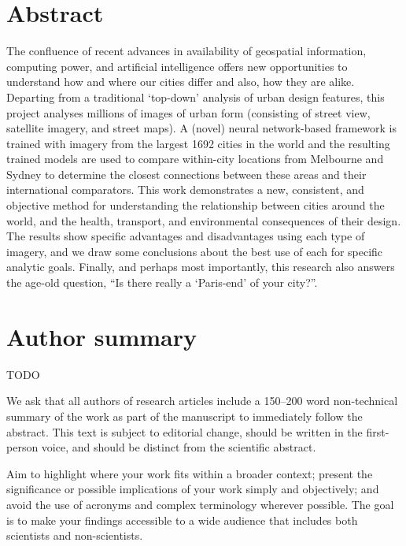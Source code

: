 \documentclass[10pt,letterpaper]{article}
\begin{document}
\section*{Abstract}
The confluence of recent advances in availability of geospatial information, computing power, and artificial intelligence offers new opportunities to understand how and where our cities differ and also, how they are alike. Departing from a traditional `top-down' analysis of urban design features, this project analyses millions of images of urban form (consisting of street view, satellite imagery, and street maps). A (novel) neural network-based framework is trained with imagery from the largest 1692 cities in the world and the resulting trained models are used to compare within-city locations from Melbourne and Sydney to determine the closest connections between these areas and their international comparators. This work demonstrates a new, consistent, and objective method for understanding the relationship between cities around the world, and the health, transport, and environmental consequences of their design. The results show specific advantages and disadvantages using each type of imagery, and we draw some conclusions about the best use of each for specific analytic goals. Finally, and perhaps most importantly, this research also answers the age-old question, ``Is there really a `Paris-end' of your city?''.


\section*{Author summary}
TODO 

We ask that all authors of research articles include a 150–200 word non-technical summary of the work as part of the manuscript to immediately follow the abstract. This text is subject to editorial change, should be written in the first-person voice, and should be distinct from the scientific abstract.

Aim to highlight where your work fits within a broader context; present the significance or possible implications of your work simply and objectively; and avoid the use of acronyms and complex terminology wherever possible. The goal is to make your findings accessible to a wide audience that includes both scientists and non-scientists.
\end{document}
